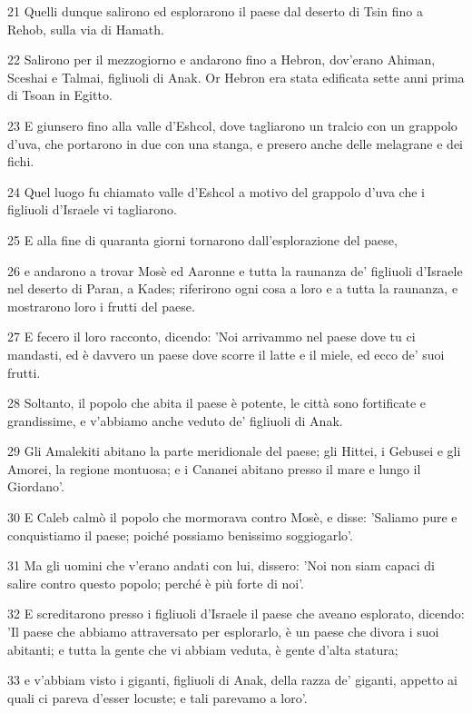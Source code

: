 \par 21 Quelli dunque salirono ed esplorarono il paese dal deserto di Tsin fino a Rehob, sulla via di Hamath.
\par 22 Salirono per il mezzogiorno e andarono fino a Hebron, dov'erano Ahiman, Sceshai e Talmai, figliuoli di Anak. Or Hebron era stata edificata sette anni prima di Tsoan in Egitto.
\par 23 E giunsero fino alla valle d'Eshcol, dove tagliarono un tralcio con un grappolo d'uva, che portarono in due con una stanga, e presero anche delle melagrane e dei fichi.
\par 24 Quel luogo fu chiamato valle d'Eshcol a motivo del grappolo d'uva che i figliuoli d'Israele vi tagliarono.
\par 25 E alla fine di quaranta giorni tornarono dall'esplorazione del paese,
\par 26 e andarono a trovar Mosè ed Aaronne e tutta la raunanza de' figliuoli d'Israele nel deserto di Paran, a Kades; riferirono ogni cosa a loro e a tutta la raunanza, e mostrarono loro i frutti del paese.
\par 27 E fecero il loro racconto, dicendo: 'Noi arrivammo nel paese dove tu ci mandasti, ed è davvero un paese dove scorre il latte e il miele, ed ecco de' suoi frutti.
\par 28 Soltanto, il popolo che abita il paese è potente, le città sono fortificate e grandissime, e v'abbiamo anche veduto de' figliuoli di Anak.
\par 29 Gli Amalekiti abitano la parte meridionale del paese; gli Hittei, i Gebusei e gli Amorei, la regione montuosa; e i Cananei abitano presso il mare e lungo il Giordano'.
\par 30 E Caleb calmò il popolo che mormorava contro Mosè, e disse: 'Saliamo pure e conquistiamo il paese; poiché possiamo benissimo soggiogarlo'.
\par 31 Ma gli uomini che v'erano andati con lui, dissero: 'Noi non siam capaci di salire contro questo popolo; perché è più forte di noi'.
\par 32 E screditarono presso i figliuoli d'Israele il paese che aveano esplorato, dicendo: 'Il paese che abbiamo attraversato per esplorarlo, è un paese che divora i suoi abitanti; e tutta la gente che vi abbiam veduta, è gente d'alta statura;
\par 33 e v'abbiam visto i giganti, figliuoli di Anak, della razza de' giganti, appetto ai quali ci pareva d'esser locuste; e tali parevamo a loro'.

